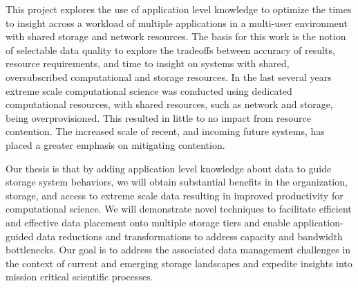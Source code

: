This project explores the use of application level knowledge to optimize the
times to insight across a workload of multiple applications in a multi-user
environment with shared storage and network resources. The basis for this
work is the notion of selectable data quality to explore the tradeoffs
between accuracy of results, resource requirements, and time to insight on
systems with shared, oversubscribed computational and storage resources. 
In the last several years extreme scale computational science was conducted
using dedicated computational resources, with shared resources, such as
network and storage, being overprovisioned. This resulted in little to no
impact from resource contention. The increased scale of recent, and incoming
future systems, has placed a greater emphasis on mitigating contention. 

Our thesis is that by adding application level knowledge
about data to guide storage system behaviors, we will obtain substantial benefits
in the organization, storage, and access to extreme scale data resulting in
improved productivity for computational science. We will demonstrate novel
techniques to facilitate efficient and effective data placement onto
multiple storage tiers and enable application-guided data reductions and
transformations to address capacity and bandwidth bottlenecks. Our goal is
to address the associated data management challenges in the context of
current and emerging storage landscapes and expedite insights into mission
critical scientific processes.

\noindent

\vfill

